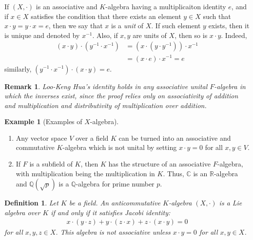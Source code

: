 \documentclass[11pt]{book}
\newtheorem{definition}{Definition}[section]
\newtheorem{remark}{Remark}[section]
\theoremstyle{definition}
\newtheorem{example}{Example}[section]
\numberwithin{equation}{subsection}
\begin{document}
If $(X,\cdot)$ is an associative and $K$-algebra having a multiplicaiton identity $e$, and if $x\in X$ satisfies the condition that there exists an element $y\in X$ such that $x\cdot y = y\cdot x = e$, then we say that $x$ is a \emph{unit} of $X$. If such element $y$ exists, then it is unique and denoted by $x^{-1}$. Also, if $x,y$ are units of $X$, then so is $x\cdot y$. Indeed,
\begin{align*}
    (x\cdot y)\cdot \left(y^{-1}\cdot x^{-1}\right) & = \left(x\cdot \left(y\cdot y^{-1}\right)\right)\cdot x^{-1} \\
    & = (x\cdot e)\cdot x^{-1} = e
\end{align*}
similarly, $\left(y^{-1}\cdot x^{-1}\right)\cdot(x\cdot y) = e$. 
\begin{remark}
Loo-Keng Hua’s identity holds in any associative unital $F$-algebra in which the inverses exist, since the proof relies only on associativity of addition and multiplication and distributivity of multiplication over addition\cite{2}.
\end{remark}

\medskip

\begin{example}[Examples of $X$-algebra]
~\begin{enumerate}[label=(\arabic*)]
    \item Any vector space $V$ over a field $K$ can be turned into an associative and commutative $K$-algebra which is not unital by setting $x\cdot y = 0$ for all $x,y\in V$.
    \item If $F$ is a subfield of $K$, then $K$ has the structure of an associative $F$-algebra, with multiplication being the multiplication in $K$. Thus, $\mathbb{C}$ is an $\mathbb{R}$-algebra and $\mathbb{Q}(\sqrt{p})$ is a $\mathbb{Q}$-algebra for prime number $p$.
\end{enumerate}
\end{example}

\medskip

\begin{definition}
Let $K$ be a field. An anticommutative $K$-algebra $(X,\cdot)$ is a Lie algebra over $K$ if and only if it satisfies Jacobi identity:
\begin{align*}
    x\cdot (y\cdot z) + y\cdot (z\cdot x) + z\cdot (x\cdot y) = 0
\end{align*}
for all $x,y,z\in X$. This algebra is not associative unless $x\cdot y = 0$ for all $x,y\in X$.
\end{definition}
\end{document}
